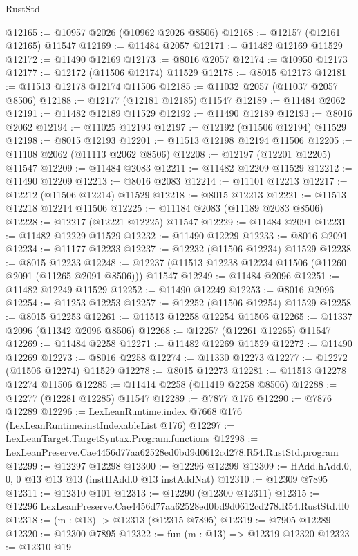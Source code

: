 \begin{lexlean}{RustStd}
\begin{coremodule}
@12165 := @10957 @2026 (@10962 @2026 @8506)
@12168 := @12157 (@12161 @12165) @11547
@12169 := @11484 @2057
@12171 := @11482 @12169 @11529
@12172 := @11490 @12169
@12173 := @8016 @2057
@12174 := @10950 @12173
@12177 := @12172 (@11506 @12174) @11529
@12178 := @8015 @12173
@12181 := @11513 @12178 @12174 @11506
@12185 := @11032 @2057 (@11037 @2057 @8506)
@12188 := @12177 (@12181 @12185) @11547
@12189 := @11484 @2062
@12191 := @11482 @12189 @11529
@12192 := @11490 @12189
@12193 := @8016 @2062
@12194 := @11025 @12193
@12197 := @12192 (@11506 @12194) @11529
@12198 := @8015 @12193
@12201 := @11513 @12198 @12194 @11506
@12205 := @11108 @2062 (@11113 @2062 @8506)
@12208 := @12197 (@12201 @12205) @11547
@12209 := @11484 @2083
@12211 := @11482 @12209 @11529
@12212 := @11490 @12209
@12213 := @8016 @2083
@12214 := @11101 @12213
@12217 := @12212 (@11506 @12214) @11529
@12218 := @8015 @12213
@12221 := @11513 @12218 @12214 @11506
@12225 := @11184 @2083 (@11189 @2083 @8506)
@12228 := @12217 (@12221 @12225) @11547
@12229 := @11484 @2091
@12231 := @11482 @12229 @11529
@12232 := @11490 @12229
@12233 := @8016 @2091
@12234 := @11177 @12233
@12237 := @12232 (@11506 @12234) @11529
@12238 := @8015 @12233
@12248 := @12237 (@11513 @12238 @12234 @11506 (@11260 @2091 (@11265 @2091 @8506))) @11547
@12249 := @11484 @2096
@12251 := @11482 @12249 @11529
@12252 := @11490 @12249
@12253 := @8016 @2096
@12254 := @11253 @12253
@12257 := @12252 (@11506 @12254) @11529
@12258 := @8015 @12253
@12261 := @11513 @12258 @12254 @11506
@12265 := @11337 @2096 (@11342 @2096 @8506)
@12268 := @12257 (@12261 @12265) @11547
@12269 := @11484 @2258
@12271 := @11482 @12269 @11529
@12272 := @11490 @12269
@12273 := @8016 @2258
@12274 := @11330 @12273
@12277 := @12272 (@11506 @12274) @11529
@12278 := @8015 @12273
@12281 := @11513 @12278 @12274 @11506
@12285 := @11414 @2258 (@11419 @2258 @8506)
@12288 := @12277 (@12281 @12285) @11547
@12289 := @7877 @176
@12290 := @7876 @12289
@12296 := LexLeanRuntime.index @7668 @176 (LexLeanRuntime.instIndexableList @176)
@12297 := LexLeanTarget.TargetSyntax.Program.functions
@12298 := LexLeanPreserve.Cae4456d77aa62528ed0bd9d0612cd278.R54.RustStd.program
@12299 := @12297 @12298
@12300 := @12296 @12299
@12309 := HAdd.hAdd.{0, 0, 0} @13 @13 @13 (instHAdd.{0} @13 instAddNat)
@12310 := @12309 @7895
@12311 := @12310 @101
@12313 := @12290 (@12300 @12311)
@12315 := @12296 LexLeanPreserve.Cae4456d77aa62528ed0bd9d0612cd278.R54.RustStd.tl0
@12318 := (m : @13) -> @12313 (@12315 @7895)
@12319 := @7905 @12289
@12320 := @12300 @7895
@12322 := fun (m : @13) => @12319 @12320
@12323 := @12310 @19

\end{coremodule}
\end{lexlean}
